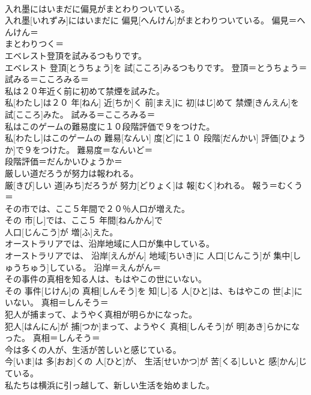 \documentclass[8pt]{extreport}
\begin{document}
\begin{CJK}{UTF8}{min}
\\	入れ墨にはいまだに偏見がまとわりついている。	
\\	入れ墨[いれずみ]にはいまだに 偏見[へんけん]がまとわりついている。	偏見＝へんけん＝ 
\\	まとわりつく＝ 
\\	エベレスト登頂を試みるつもりです。	
\\	エベレスト 登頂[とうちょう]を 試[こころ]みるつもりです。	登頂＝とうちょう＝ 
\\	試みる＝こころみる＝ 
\\	私は２０年近く前に初めて禁煙を試みた。	
\\	私[わたし]は２０ 年[ねん] 近[ちか]く 前[まえ]に 初[はじ]めて 禁煙[きんえん]を 試[こころ]みた。	試みる＝こころみる＝ 
\\	私はこのゲームの難易度に１０段階評価で９をつけた。	
\\	私[わたし]はこのゲームの 難易[なんい] 度[ど]に１０ 段階[だんかい] 評価[ひょうか]で９をつけた。	難易度＝なんいど＝ 
\\	段階評価＝だんかいひょうか＝ 
\\	厳しい道だろうが努力は報われる。	
\\	厳[きび]しい 道[みち]だろうが 努力[どりょく]は 報[むく]われる。	報う＝むくう＝ 
\\	その市では、ここ５年間で２０％人口が増えた。	
\\	その 市[し]では、ここ５ 年間[ねんかん]で 
\\	[にじゅっぱーせんと] 人口[じんこう]が 増[ふ]えた。	
\\	オーストラリアでは、沿岸地域に人口が集中している。	
\\	オーストラリアでは、 沿岸[えんがん] 地域[ちいき]に 人口[じんこう]が 集中[しゅうちゅう]している。	沿岸＝えんがん＝ 
\\	その事件の真相を知る人は、もはやこの世にいない。	
\\	その 事件[じけん]の 真相[しんそう]を 知[し]る 人[ひと]は、もはやこの 世[よ]にいない。	真相＝しんそう＝ 
\\	犯人が捕まって、ようやく真相が明らかになった。	
\\	犯人[はんにん]が 捕[つか]まって、ようやく 真相[しんそう]が 明[あき]らかになった。	真相＝しんそう＝ 
\\	今は多くの人が、生活が苦しいと感じている。	
\\	今[いま]は 多[おお]くの 人[ひと]が、 生活[せいかつ]が 苦[くる]しいと 感[かん]じている。	
\\	私たちは横浜に引っ越して、新しい生活を始めました。	

\end{CJK}
\end{document}
